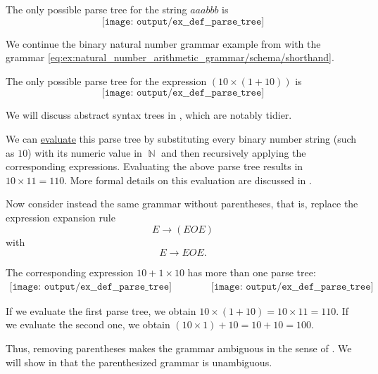 \begin{example}
\begin{thmenum}
    The only possible parse tree for the string \( aaabbb \) is
    \begin{equation*}
      \texttt{[image: output/ex\_\_def\_\_parse\_tree]}
    \end{equation*}

     We continue the binary natural number grammar example from  with the grammar \eqref{eq:ex:natural_number_arithmetic_grammar/schema/shorthand}.

    The only possible parse tree for the expression \( (10 \times (1 + 10)) \) is
    \begin{equation*}
      \texttt{[image: output/ex\_\_def\_\_parse\_tree]}
    \end{equation*}

    We will discuss abstract syntax trees in , which are notably tidier.

    We can \hyperref[con:evaluation]{evaluate} this parse tree by substituting every binary number string (such as \( 10 \)) with its numeric value in \( \BbbN \) and then recursively applying the corresponding expressions. Evaluating the above parse tree results in \( 10 \times 11 = 110 \). More formal details on this evaluation are discussed in .

    Now consider instead the same grammar without parentheses, that is, replace the expression expansion rule
    \begin{equation*}
      E \to (E O E)
    \end{equation*}
    with
    \begin{equation*}
      E \to E O E.
    \end{equation*}

    The corresponding expression \( 10 + 1 \times 10 \) has more than one parse tree:
    \begin{equation*}
      \begin{aligned}
        \texttt{[image: output/ex\_\_def\_\_parse\_tree]}
        \qquad\qquad
        \texttt{[image: output/ex\_\_def\_\_parse\_tree]}
      \end{aligned}
    \end{equation*}

    If we evaluate the first parse tree, we obtain \( 10 \times (1 + 10) = 10 \times 11 = 110 \). If we evaluate the second one, we obtain \( (10 \times 1) + 10 = 10 + 10 = 100 \).

    Thus, removing parentheses makes the grammar ambiguous in the sense of . We will show in  that the parenthesized grammar is unambiguous.
  \end{thmenum}
\end{example}

